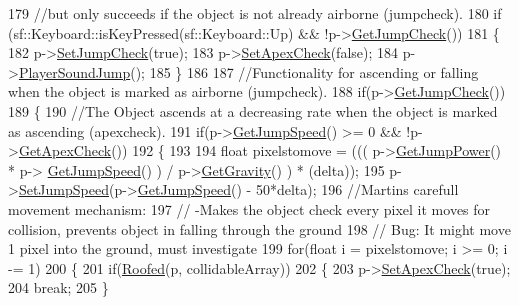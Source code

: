 \begin{DoxyCode}
179     \textcolor{comment}{//but only succeeds if the object is not already airborne (jumpcheck).}
180     \textcolor{keywordflow}{if} (sf::Keyboard::isKeyPressed(sf::Keyboard::Up) && !p->\hyperlink{classPlayerObject_a203e254033dbe429d05f6c022994a824}{GetJumpCheck}())
181     \{
182         p->\hyperlink{classPlayerObject_a1084ab4b57deee26ae98a131be9fb9ad}{SetJumpCheck}(\textcolor{keyword}{true});
183         p->\hyperlink{classPlayerObject_a6cd0c1faaf0d2cd1749d11a7e9e20ff8}{SetApexCheck}(\textcolor{keyword}{false});
184         p->\hyperlink{classPlayerObject_a4f41bf61971eb3a71346681f25a97fc0}{PlayerSoundJump}();
185     \}
186 
187     \textcolor{comment}{//Functionality for ascending or falling when the object is marked as airborne (jumpcheck).}
188     \textcolor{keywordflow}{if}(p->\hyperlink{classPlayerObject_a203e254033dbe429d05f6c022994a824}{GetJumpCheck}())
189     \{
190         \textcolor{comment}{//The Object ascends at a decreasing rate when the object is marked as ascending (apexcheck).}
191         \textcolor{keywordflow}{if}(p->\hyperlink{classPlayerObject_a5beb2aab79ca831d12736e068f83c1f8}{GetJumpSpeed}() >= 0 && !p->\hyperlink{classPlayerObject_a6ec9bab3a7af3a353dbae4db861fee4a}{GetApexCheck}())
192         \{
193 
194             \textcolor{keywordtype}{float} pixelstomove = ((( p->\hyperlink{classPlayerObject_a857d074a00ebc41ff169470b713c42a6}{GetJumpPower}() * p->
      \hyperlink{classPlayerObject_a5beb2aab79ca831d12736e068f83c1f8}{GetJumpSpeed}() ) / p->\hyperlink{classPlayerObject_a6eeb8a060c9d5b6b4ca0104bf77aa346}{GetGravity}() ) * (delta));
195             p->\hyperlink{classPlayerObject_a9fcbe47e9d0cb21d6eae498280087076}{SetJumpSpeed}(p->\hyperlink{classPlayerObject_a5beb2aab79ca831d12736e068f83c1f8}{GetJumpSpeed}() - 50*delta);
196             \textcolor{comment}{//Martins carefull movement mechanism:}
197             \textcolor{comment}{//  -Makes the object check every pixel it moves for collision, prevents object in falling
       through the ground}
198             \textcolor{comment}{//  Bug: It might move 1 pixel into the ground, must investigate}
199             \textcolor{keywordflow}{for}(\textcolor{keywordtype}{float} i = pixelstomove; i >= 0; i -= 1)
200             \{
201                 \textcolor{keywordflow}{if}(\hyperlink{classPhysics_ad95b0cb8eec16acd74177a8d79eb0850}{Roofed}(p, collidableArray))
202                 \{
203                     p->\hyperlink{classPlayerObject_a6cd0c1faaf0d2cd1749d11a7e9e20ff8}{SetApexCheck}(\textcolor{keyword}{true});
204                     \textcolor{keywordflow}{break};
205                 \}

\end{DoxyCode}
